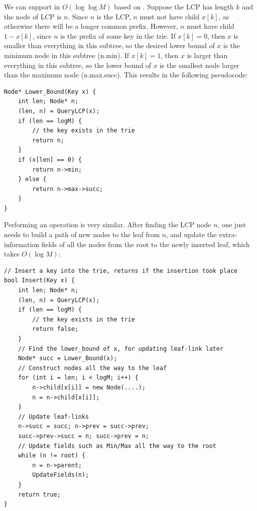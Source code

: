 \documentclass[11pt, usletter]{article}
\begin{document}
We can support \lowerbound in $O(\log\log M)$ based on \QueryLCP. 
Suppose the LCP has length $k$ and the node of LCP is $n$. 
Since $n$ is the LCP, $n$ must not have child $x[k]$, as otherwise there will be a longer common prefix. 
However, $n$ must have child $1-x[k]$, since $n$ is the prefix of some key in the trie. 
If $x[k]=0$, then $x$ is smaller than everything in this subtree, 
so the desired lower bound of $x$ is the minimum node in this subtree (n.min). 
If $x[k]=1$, then $x$ is larger than everything in this subtree, 
so the lower bound of $x$ is the smallest node larger than the maximum node (n.max.succ). 
This results in the following pseudocode:

\singlespacing\begin{codebox}
\begin{verbatim}
Node* Lower_Bound(Key x) {
    int len; Node* n;
    (len, n) = QueryLCP(x);
    if (len == logM) {
        // the key exists in the trie
        return n;
    }
    if (x[len] == 0) {
        return n->min;
    } else {
        return n->max->succ;
    }
}
\end{verbatim}
\end{codebox}\doublespacing

Performing an \insertion operation is very similar. 
After finding the LCP node $n$, one just needs to build a path of new nodes to the leaf from $n$, 
and update the extra-information fields of all the nodes from the root to the newly inserted leaf,
which takes $O(\log M)$:

\singlespacing\begin{codebox}
\begin{verbatim}
// Insert a key into the trie, returns if the insertion took place
bool Insert(Key x) {
    int len; Node* n;
    (len, n) = QueryLCP(x);
    if (len == logM) {
        // the key exists in the trie
        return false;
    }
    // Find the lower_bound of x, for updating leaf-link later
    Node* succ = Lower_Bound(x);
    // Construct nodes all the way to the leaf
    for (int i = len; i < logM; i++) {
        n->child[x[i]] = new Node(....);
        n = n->child[x[i]];
    }
    // Update leaf-links
    n->succ = succ; n->prev = succ->prev;
    succ->prev->succ = n; succ->prev = n;
    // Update fields such as Min/Max all the way to the root
    while (n != root) {
        n = n->parent;
        UpdateFields(n);
    }
    return true;
}
\end{verbatim}
\end{codebox}\doublespacing
\end{document}
